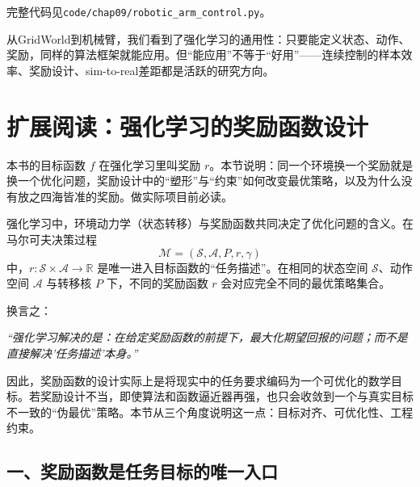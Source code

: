 完整代码见\texttt{code/chap09/robotic\_arm\_control.py}。

\begin{remark}
从GridWorld到机械臂，我们看到了强化学习的通用性：只要能定义状态、动作、奖励，同样的算法框架就能应用。但“能应用”不等于“好用”——连续控制的样本效率、奖励设计、sim-to-real差距都是活跃的研究方向。
\end{remark}

\section*{扩展阅读：强化学习的奖励函数设计}

\begin{tcolorbox}[colback=gray!5, colframe=gray!50, title=本节导读]
本书的目标函数 $f$ 在强化学习里叫奖励 $r$。本节说明：同一个环境换一个奖励就是换一个优化问题，奖励设计中的“塑形”与“约束”如何改变最优策略，以及为什么没有放之四海皆准的奖励。做实际项目前必读。
\end{tcolorbox}

强化学习中，环境动力学（状态转移）与奖励函数共同决定了优化问题的含义。在马尔可夫决策过程
\[
\mathcal{M} = (\mathcal{S}, \mathcal{A}, P, r, \gamma)
\]
中，$r:\mathcal{S}\times\mathcal{A}\to\mathbb{R}$ 是唯一进入目标函数的“任务描述”。在相同的状态空间 $\mathcal{S}$、动作空间 $\mathcal{A}$ 与转移核 $P$ 下，不同的奖励函数 $r$ 会对应完全不同的最优策略集合。

换言之：

\begin{center}
\emph{“强化学习解决的是：在给定奖励函数的前提下，最大化期望回报的问题；而不是直接解决'任务描述'本身。”}
\end{center}

因此，奖励函数的设计实际上是将现实中的任务要求编码为一个可优化的数学目标。若奖励设计不当，即使算法和函数逼近器再强，也只会收敛到一个与真实目标不一致的“伪最优”策略。本节从三个角度说明这一点：目标对齐、可优化性、工程约束。

\subsection*{一、奖励函数是任务目标的唯一入口}


